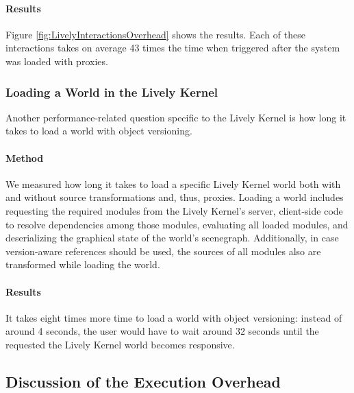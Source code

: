 \paragraph{Results}
Figure \ref{fig:LivelyInteractionsOverhead} shows the results.
Each of these interactions takes on average 43 times the time when triggered after the system was loaded with proxies.



\subsubsection{Loading a World in the Lively Kernel}

Another performance-related question specific to the Lively Kernel is how long it takes to load a world with object versioning.

\paragraph{Method}
We measured how long it takes to load a specific Lively Kernel world both with and without source transformations and, thus, proxies.
Loading a world includes requesting the required modules from the Lively Kernel's server, client-side code to resolve dependencies among those modules, evaluating all loaded modules, and deserializing the graphical state of the world's scenegraph.
Additionally, in case version-aware references should be used, the sources of all modules also are transformed while loading the world.

\paragraph{Results}
It takes eight times more time to load a world with object versioning: instead of around 4 seconds, the user would have to wait around 32 seconds until the requested the Lively Kernel world becomes responsive.




\subsection{Discussion of the Execution Overhead}


    
